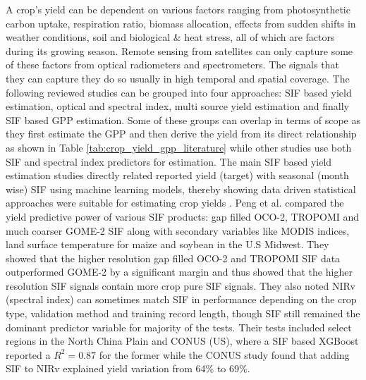 A crop's yield can be dependent on various factors ranging from photosynthetic carbon uptake, respiration ratio, biomass allocation, effects from sudden shifts in weather conditions, soil and biological \& heat stress, all of which are factors during its growing season. Remote sensing from satellites can only capture some of these factors from optical radiometers and spectrometers. The signals that they can capture they do so usually in high temporal and spatial coverage. The following reviewed studies can be grouped into four approaches: SIF based yield estimation, optical and spectral index, multi source yield estimation and finally SIF based GPP estimation. Some of these groups can overlap in terms of scope as they first estimate the GPP and then derive the yield from its direct relationship as shown in Table \ref{tab:crop_yield_gpp_literature} while other studies use both SIF and spectral index predictors for estimation. The main SIF based yield estimation studies directly related reported yield (target) with seasonal (month wise) SIF using machine learning models, thereby showing data driven statistical approaches were suitable for estimating crop yields \cite{peng2020assessing} \cite{zheng2025modeling} \cite{joshi2023winter}. Peng et al. \cite{peng2020assessing} compared the yield predictive power of various SIF products: gap filled OCO-2, TROPOMI and much coarser GOME-2 SIF along with secondary variables like MODIS indices, land surface temperature for maize and soybean in the U.S Midwest. They showed that the higher resolution gap filled OCO-2 and TROPOMI SIF data outperformed GOME-2 by a significant margin and thus showed that the higher resolution SIF signals contain more crop pure SIF signals. They also noted NIRv (spectral index) can sometimes match SIF in performance depending on the crop type, validation method and training record length, though SIF still remained the dominant predictor variable for majority of the tests. Their tests included select regions in the North China Plain and CONUS (US), where a SIF based XGBoost reported a $R^2=0.87$ for the former while the CONUS study found that adding SIF to NIRv explained yield variation from 64\% to 69\%. 

